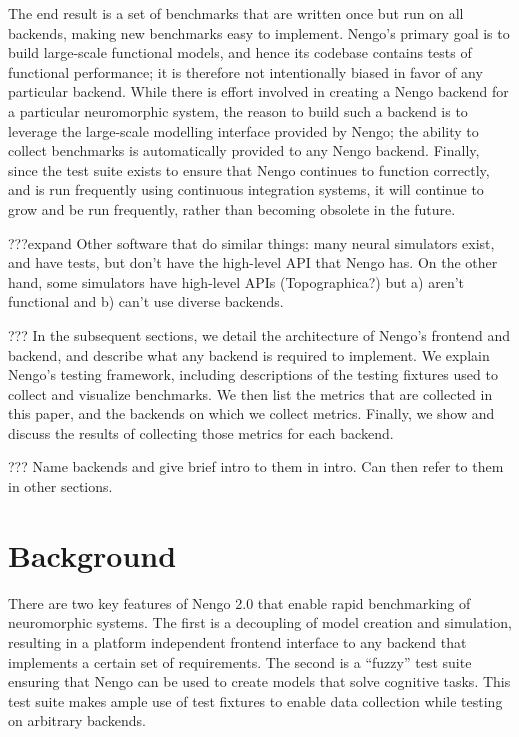 \documentclass{frontiersSCNS}
\begin{document}
The end result is a set of benchmarks that
are written once but run on all backends,
making new benchmarks easy to implement.
Nengo's primary goal is to
build large-scale functional models,
and hence its codebase contains
tests of functional performance;
it is therefore not intentionally
biased in favor of any particular backend.
While there is effort involved in creating
a Nengo backend for a particular neuromorphic system,
the reason to build such a backend
is to leverage the large-scale modelling interface
provided by Nengo;
the ability to collect benchmarks
is automatically provided to any Nengo backend.
Finally, since the test suite exists
to ensure that Nengo continues to function
correctly, and is run frequently using
continuous integration systems,
it will continue to grow and be run frequently,
rather than becoming obsolete in the future.

???expand Other software that do similar things:
many neural simulators exist, and have tests,
but don't have the high-level API
that Nengo has.
On the other hand, some simulators
have high-level APIs
(Topographica?) but a) aren't functional
and b) can't use diverse backends.

??? In the subsequent sections,
we detail the architecture of Nengo's
frontend and backend,
and describe what any backend
is required to implement.
We explain Nengo's testing framework,
including descriptions of the testing fixtures
used to collect and visualize benchmarks.
We then list the metrics that are collected
in this paper,
and the backends on which we collect metrics.
Finally, we show and discuss
the results of collecting those metrics
for each backend.

??? Name backends and give brief intro to them
in intro. Can then refer to them in other sections.

\section{Background}

There are two key features of Nengo 2.0
that enable rapid benchmarking of neuromorphic systems.
The first is a decoupling of model creation and simulation,
resulting in a platform independent frontend interface
to any backend that implements a certain set of requirements.
The second is a ``fuzzy'' test suite ensuring that
Nengo can be used to create models that solve cognitive tasks.
This test suite makes ample use of test fixtures
to enable data collection while testing on arbitrary backends.
\end{document}

